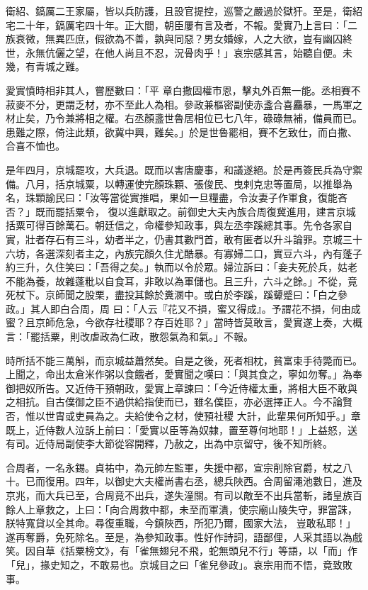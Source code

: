 \begin{pinyinscope}
 衛紹、鎬厲二王家屬，皆以兵防護，且設官提控，巡警之嚴過於獄犴。至是，衛紹宅二十年，鎬厲宅四十年。正大間，朝臣屢有言及者，不報。愛實乃上言曰：「二族衰微，無異匹庶，假欲為不善，孰與同惡？男女婚嫁，人之大欲，豈有幽囚終世，永無伉儷之望，在他人尚且不忍，況骨肉乎！」哀宗感其言，始聽自便。未幾，有青城之難。



 愛實憤時相非其人，嘗歷數曰：「平
 章白撒固權市恩，擊丸外百無一能。丞相賽不菽麥不分，更謂乏材，亦不至此人為相。參政兼樞密副使赤盞合喜麤暴，一馬軍之材止矣，乃令兼將相之權。右丞顏盞世魯居相位已七八年，碌碌無補，備員而已。患難之際，倚注此類，欲冀中興，難矣。」於是世魯罷相，賽不乞致仕，而白撒、合喜不恤也。



 是年四月，京城罷攻，大兵退。既而以害唐慶事，和議遂絕。於是再簽民兵為守禦備。八月，括京城粟，以轉運使完顏珠顆、張俊民、曳剌克忠等置局，以推舉為名，珠顆諭民曰：「汝等當從實推唱，果如一旦糧盡，令汝妻子作軍食，復能吝否？」既而罷括粟令，
 復以進獻取之。前御史大夫內族合周復冀進用，建言京城括粟可得百餘萬石。朝廷信之，命權參知政事，與左丞李蹊總其事。先令各家自實，壯者存石有三斗，幼者半之，仍書其數門首，敢有匿者以升斗論罪。京城三十六坊，各選深刻者主之，內族完顏久住尤酷暴。有寡婦二口，實豆六斗，內有蓬子約三升，久住笑曰：「吾得之矣。」執而以令於眾。婦泣訴曰：「妾夫死於兵，姑老不能為養，故雜蓬粃以自食耳，非敢以為軍儲也。且三升，六斗之餘。」不從，竟死杖下。京師聞之股栗，盡投其餘於糞溷中。或白於李蹊，蹊顰蹙曰：「白之參政。」其人即白合周，周
 曰：「人云『花又不損，蜜又得成』。予謂花不損，何由成蜜？且京師危急，今欲存社稷耶？存百姓耶？」當時皆莫敢言，愛實遂上奏，大概言：「罷括粟，則改虐政為仁政，散怨氣為和氣。」不報。



 時所括不能三萬斛，而京城益蕭然矣。自是之後，死者相枕，貧富束手待斃而已。上聞之，命出太倉米作粥以食餓者，愛實聞之嘆曰：「與其食之，寧如勿奪。」為奉御把奴所告。又近侍干預朝政，愛實上章諫曰：「今近侍權太重，將相大臣不敢與之相抗。自古僕御之臣不過供給指使而已，雖名僕臣，亦必選擇正人。今不論賢否，惟以世胄或吏員為之。夫給使令之材，使預社稷
 大計，此輩果何所知乎。」章既上，近侍數人泣訴上前曰：「愛實以臣等為奴隸，置至尊何地耶！」上益怒，送有司。近侍局副使李大節從容開釋，乃赦之，出為中京留守，後不知所終。



 合周者，一名永錫。貞祐中，為元帥左監軍，失援中都，宣宗削除官爵，杖之八十。已而復用。四年，以御史大夫權尚書右丞，總兵陜西。合周留澠池數日，進及京兆，而大兵已至，合周竟不出兵，遂失潼關。有司以敵至不出兵當斬，諸皇族百餘人上章救之，上曰：「向合周救中都，未至而軍潰，使宗廟山陵失守，罪當誅，朕特寬貸以全其命。尋復重職，今鎮陜西，所犯乃爾，國家大法，
 豈敢私耶！」遂再奪爵，免死除名。至是，為參知政事。性好作詩詞，語鄙俚，人采其語以為戲笑。因自草《括粟榜文》，有「雀無翅兒不飛，蛇無頭兒不行」等語，以「而」作「兒」，掾史知之，不敢易也。京城目之曰「雀兒參政」。哀宗用而不悟，竟致敗事。




\end{pinyinscope}
